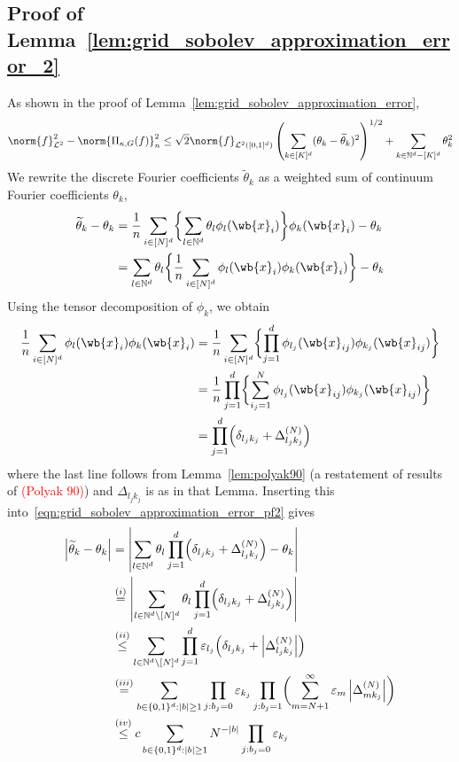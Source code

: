 \documentclass{article}
\newcommand{\abs}[1]{\left \lvert #1 \right \rvert}
\newcommand{\1}{\mathbf{1}}
\newcommand{\Nbb}{\mathbb{N}}
\newcommand{\Leb}{\mathcal{L}}
\newcommand{\wt}[1]{\widetilde{#1}}
\theoremstyle{alden}
\theoremstyle{aldenthm}
\theoremstyle{definition}
\theoremstyle{remark}
\begin{document}
\subsection{Proof of Lemma~\ref{lem:grid_sobolev_approximation_error_2}}
As shown in the proof of Lemma~\ref{lem:grid_sobolev_approximation_error}, 
\begin{equation}
\norm{f}_{\Leb^2}^2 - \norm{\Pi_{\kappa,G}(f)}_n^2 \leq \sqrt{2} \norm{f}_{\Leb^2([0,1]^d)} \left(\sum_{k \in [K]^d} (\theta_k - \wt{\theta}_k)^2\right)^{1/2} + \sum_{k \in \mathbb{N}^d - [K]^d} \theta_k^2 \label{eqn:grid_sobolev_approximation_error_2_pf2}
\end{equation}
We rewrite the discrete Fourier coefficients $\wt{\theta}_k$ as a weighted sum of continuum Fourier coefficients $\theta_k$,
\begin{align}
\wt{\theta}_k - \theta_k & = \frac{1}{n} \sum_{i \in [N]^d} \biggl\{\sum_{l \in \Nbb^d} \theta_l \phi_{l}(\wb{x}_i)\biggr\} \phi_k(\wb{x}_i)  - \theta_k \nonumber \\
& = \sum_{l \in \Nbb^d}  \theta_l \biggl\{\frac{1}{n} \sum_{i \in [N]^d} \phi_{l}(\wb{x}_i) \phi_k(\wb{x}_i)\biggr\}  - \theta_k \label{eqn:grid_sobolev_approximation_error_2_pf1}
\end{align}
Using the tensor decomposition of $\phi_k$, we obtain
\begin{align*}
\frac{1}{n} \sum_{i \in [N]^d} \phi_{l}(\wb{x}_i) \phi_k(\wb{x}_i) & = \frac{1}{n} \sum_{i \in [N]^d} \biggl\{\prod_{j = 1}^{d} \phi_{l_j}(\wb{x}_{ij}) \phi_{k_j}(\wb{x}_{ij}) \biggr\} \\
& = \frac{1}{n} \prod_{j = 1}^{d} \biggl\{\sum_{i_j = 1}^{N}  \phi_{l_j}(\wb{x}_{ij}) \phi_{k_j}(\wb{x}_{ij})  \biggr\} \\
& = \prod_{j = 1}^{d} \Bigl(\delta_{l_j k_j} + \Delta_{l_j k_j}^{(N)}\Bigr)
\end{align*}
where the last line follows from Lemma~\ref{lem:polyak90} (a restatement of results of \textcolor{red}{(Polyak 90)}) and $\Delta_{l_jk_j}$ is as in that Lemma. Inserting this into~\eqref{eqn:grid_sobolev_approximation_error_pf2} gives
\begin{align*}
\abs{\wt{\theta}_k - \theta_k} & = \abs{\sum_{l \in \Nbb^d}  \theta_l \prod_{j = 1}^{d}\Bigl( \delta_{l_j k_j} + \Delta_{l_jk_j}^{(N)}\Bigr)  - \theta_k} \\
& \overset{(i)}{=} \abs{\sum_{l \in \Nbb^d \setminus [N]^d}  \theta_l \prod_{j = 1}^{d}\Bigl( \delta_{l_j k_j} + \Delta_{l_jk_j}^{(N)}\Bigr)} \\
& \overset{(ii)}{\leq} \sum_{l \in \Nbb^d \setminus [N]^d} \prod_{j = 1}^{d} \varepsilon_{l_j}\Bigl(\delta_{l_j k_j} + \abs{\Delta_{l_jk_j}^{(N)}}\Bigr) \\
& \overset{(iii)}{=} \sum_{b \in \{0,1\}^d: \abs{b} \geq 1}\prod_{j: b_j = 0} \varepsilon_{k_j}\prod_{j: b_j = 1} \biggl(\sum_{m = N + 1}^{\infty} \varepsilon_{m} \abs{\Delta_{mk_j}^{(N)}}\biggr) \\
& \overset{(iv)}{\leq} c \sum_{b \in \{0,1\}^d : \abs{b} \geq 1} N^{-\abs{b}} \prod_{j: b_j = 0} \varepsilon_{k_j} 
\end{align*}
\end{document}
